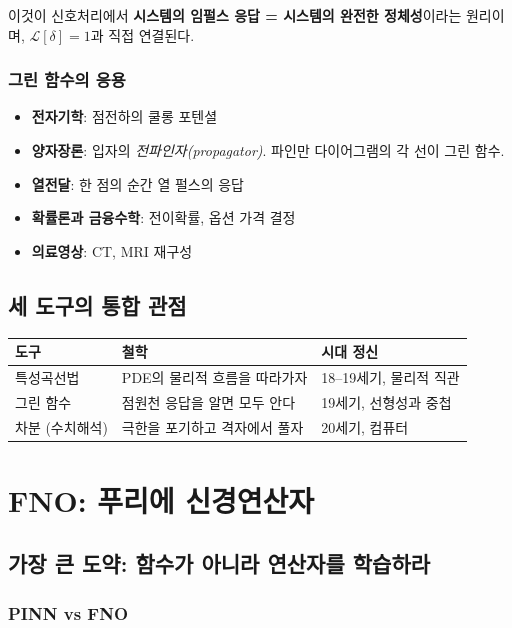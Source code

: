 \documentclass[11pt,a4paper]{article}
\begin{document}
이것이 신호처리에서 \textbf{시스템의 임펄스 응답 = 시스템의 완전한 정체성}이라는 원리이며, $\mathcal{L}[\delta] = 1$과 직접 연결된다.

\subsubsection{그린 함수의 응용}

\begin{itemize}
\item \textbf{전자기학}: 점전하의 쿨롱 포텐셜
\item \textbf{양자장론}: 입자의 \emph{전파인자(propagator)}. 파인만 다이어그램의 각 선이 그린 함수.
\item \textbf{열전달}: 한 점의 순간 열 펄스의 응답
\item \textbf{확률론과 금융수학}: 전이확률, 옵션 가격 결정
\item \textbf{의료영상}: CT, MRI 재구성
\end{itemize}

\subsection{세 도구의 통합 관점}

\begin{center}
\begin{tabular}{lll}
\toprule
도구 & 철학 & 시대 정신 \\
\midrule
특성곡선법 & PDE의 물리적 흐름을 따라가자 & 18--19세기, 물리적 직관 \\
그린 함수 & 점원천 응답을 알면 모두 안다 & 19세기, 선형성과 중첩 \\
차분 (수치해석) & 극한을 포기하고 격자에서 풀자 & 20세기, 컴퓨터 \\
\bottomrule
\end{tabular}
\end{center}

\section{FNO: 푸리에 신경연산자}

\subsection{가장 큰 도약: 함수가 아니라 연산자를 학습하라}

\subsubsection{PINN vs FNO}
\end{document}
